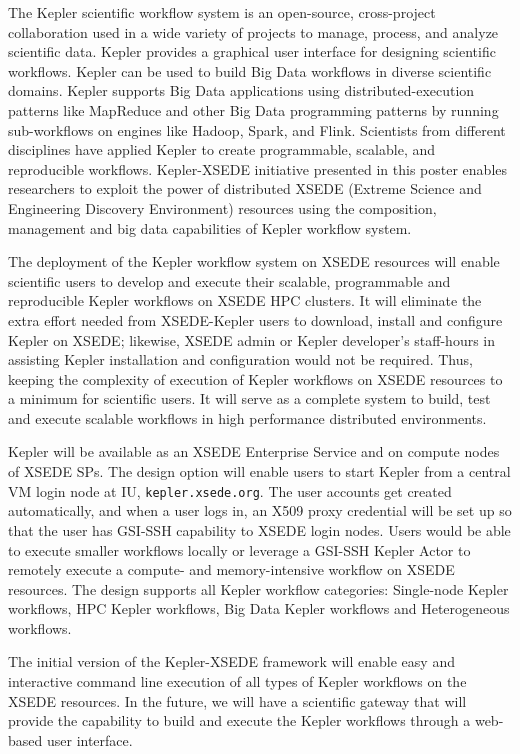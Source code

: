 The Kepler scientific workflow system\cite{source1} is an open-source, cross-project collaboration used in a wide variety of projects to manage, process, and analyze scientific data. Kepler provides a graphical user interface for designing scientific workflows. Kepler can be used to build Big Data workflows in diverse scientific domains\cite{source2}. Kepler supports Big Data applications using distributed-execution patterns like MapReduce and other Big Data programming patterns by running sub-workflows on engines like Hadoop, Spark, and Flink. Scientists from different disciplines have applied Kepler to create programmable, scalable, and reproducible workflows. Kepler-XSEDE initiative presented in this poster enables researchers to exploit the power of distributed XSEDE (Extreme Science and Engineering Discovery Environment) resources\cite{source3} using the composition, management and big data capabilities of Kepler workflow system.

The deployment of the Kepler workflow system on XSEDE resources will enable scientific users to develop and execute their scalable, programmable and reproducible Kepler workflows on XSEDE HPC clusters. It will eliminate the extra effort needed from XSEDE-Kepler users to download, install and configure Kepler on XSEDE; likewise, XSEDE admin or Kepler developer's staff-hours in assisting Kepler installation and configuration would not be required. Thus, keeping the complexity of execution of Kepler workflows on XSEDE resources to a minimum for scientific users. It will serve as a complete system to build, test and execute scalable workflows in high performance distributed environments.

Kepler will be available as an XSEDE Enterprise Service and on compute nodes of XSEDE SPs. The design option will enable users to start Kepler from a central VM login node at IU, \texttt{kepler.xsede.org}. The user accounts get created automatically, and when a user logs in, an X509 proxy credential will be set up so that the user has GSI-SSH capability to XSEDE login nodes. Users would be able to execute smaller workflows locally or leverage a GSI-SSH Kepler Actor to remotely execute a compute- and memory-intensive workflow on XSEDE resources. The design supports all Kepler workflow categories: Single-node Kepler workflows, HPC Kepler workflows, Big Data Kepler workflows and Heterogeneous workflows.

The initial version of the Kepler-XSEDE framework will enable easy and interactive command line execution of all types of Kepler workflows on the XSEDE resources. In the future, we will have a scientific gateway that will provide the capability to build and execute the Kepler workflows through a web-based user interface.